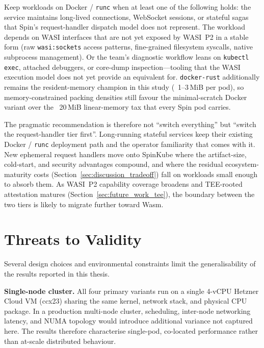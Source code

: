 \begin{sloppypar}
Keep workloads on Docker / \texttt{runc} when at least one of the following holds: the service maintains long-lived connections, WebSocket sessions, or stateful sagas that Spin's request-handler dispatch model does not represent. The workload depends on \acs{WASI} interfaces that are not yet exposed by \acs{WASI}~P2 in a stable form (raw \texttt{wasi:sockets} access patterns, fine-grained filesystem syscalls, native subprocess management). Or the team's diagnostic workflow leans on \texttt{kubectl exec}, attached debuggers, or core-dump inspection---tooling that the \acs{WASI} execution model does not yet provide an equivalent for. \texttt{docker-rust} additionally remains the resident-memory champion in this study (~1--3\,MiB per pod), so memory-constrained packing densities still favour the minimal-scratch Docker variant over the ~20\,MiB linear-memory tax that every Spin pod carries.
\end{sloppypar}

\begin{sloppypar}
The pragmatic recommendation is therefore not ``switch everything'' but ``switch the request-handler tier first''. Long-running stateful services keep their existing Docker / \texttt{runc} deployment path and the operator familiarity that comes with it. New ephemeral request handlers move onto SpinKube where the artifact-size, cold-start, and security advantages compound, and where the residual ecosystem-maturity costs (Section~\ref{sec:discussion_tradeoff}) fall on workloads small enough to absorb them. As \acs{WASI}~P2 capability coverage broadens and \acs{TEE}-rooted attestation matures (Section~\ref{sec:future_work_tee}), the boundary between the two tiers is likely to migrate further toward \acs{Wasm}.
\end{sloppypar}

\section{Threats to Validity}
\label{sec:threats_to_validity}

Several design choices and environmental constraints limit the generalisability of the results reported in this thesis.

\textbf{Single-node cluster.} All four primary variants run on a single 4-vCPU Hetzner Cloud \acs{VM} (ccx23) sharing the same kernel, network stack, and physical \acs{CPU} package. In a production multi-node cluster, scheduling, inter-node networking latency, and \acs{NUMA} topology would introduce additional variance not captured here. The results therefore characterise single-pod, co-located performance rather than at-scale distributed behaviour.

